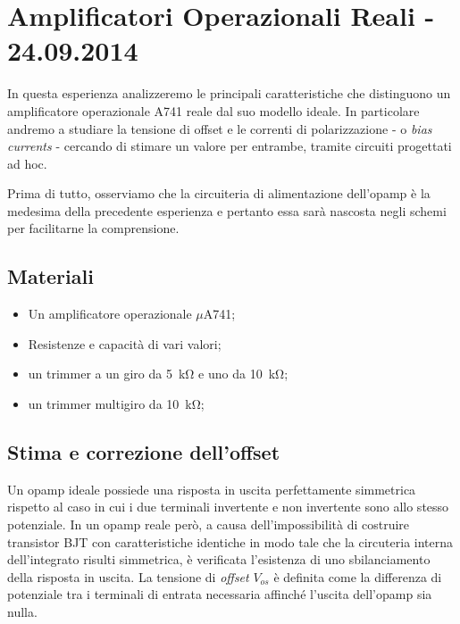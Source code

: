\section{Amplificatori Operazionali Reali - 24.09.2014}

In questa esperienza analizzeremo le principali caratteristiche che distinguono un amplificatore operazionale \si{\micro}A741 reale dal suo modello ideale.
In particolare andremo a studiare la tensione di offset e le correnti di polarizzazione - o \textit{bias currents} - cercando di stimare un valore per entrambe, tramite circuiti progettati ad hoc.

Prima di tutto, osserviamo che la circuiteria di alimentazione dell'opamp è la medesima della precedente esperienza e pertanto essa sarà nascosta negli schemi per facilitarne la comprensione.

\subsection*{Materiali}

\begin{itemize} [noitemsep]
\item Un amplificatore operazionale $\mu$A741;
\item Resistenze e capacità di vari valori;
\item un trimmer a un giro da \SI{5}{\kilo\ohm} e uno da \SI{10}{\kilo\ohm};
\item un trimmer multigiro da \SI{10}{\kilo\ohm};
\end{itemize}

\subsection{Stima e correzione dell'offset}
\label{par2:offset}

Un opamp ideale possiede una risposta in uscita perfettamente simmetrica rispetto al caso in cui i due terminali invertente e non invertente sono allo stesso potenziale.
In un opamp reale però, a causa dell'impossibilità di costruire transistor BJT con caratteristiche identiche in modo tale che la circuteria interna dell'integrato risulti simmetrica, è verificata l'esistenza di uno sbilanciamento della risposta in uscita.
La tensione di \textit{offset} $V_{os}$ è definita come la differenza di potenziale tra i terminali di entrata necessaria affinché l'uscita dell'opamp sia nulla.

